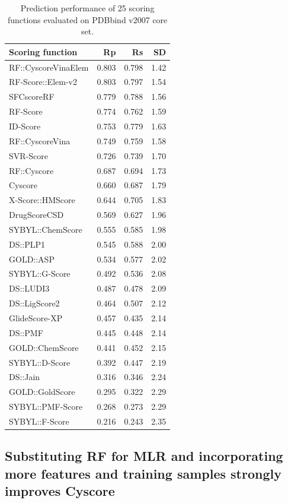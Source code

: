 \begin{table}
\caption{Prediction performance of 25 scoring functions evaluated on PDBbind v2007 core set.}
\label{rfcyscore:trn1105tst195}
\begin{tabular}{lrrr}
\hline
Scoring function & Rp & Rs & SD\\
\hline
RF::CyscoreVinaElem & 0.803 & 0.798 & 1.42\\
RF-Score::Elem-v2 & 0.803 & 0.797 & 1.54 \\
SFCscoreRF & 0.779 & 0.788 & 1.56\\
RF-Score & 0.774 & 0.762 & 1.59\\
ID-Score & 0.753 & 0.779 & 1.63\\
RF::CyscoreVina & 0.749 & 0.759 & 1.58\\
SVR-Score & 0.726 & 0.739 & 1.70\\
RF::Cyscore & 0.687 & 0.694 & 1.73\\
Cyscore & 0.660 & 0.687 & 1.79\\
X-Score::HMScore & 0.644 & 0.705 & 1.83\\
DrugScoreCSD & 0.569 & 0.627 & 1.96\\
SYBYL::ChemScore & 0.555 & 0.585 & 1.98\\
DS::PLP1 & 0.545 & 0.588 & 2.00\\
GOLD::ASP & 0.534 & 0.577 & 2.02\\
SYBYL::G-Score & 0.492 & 0.536 & 2.08\\
DS::LUDI3 & 0.487 & 0.478 & 2.09\\
DS::LigScore2 & 0.464 & 0.507 & 2.12\\
GlideScore-XP & 0.457 & 0.435 & 2.14\\
DS::PMF & 0.445 & 0.448 & 2.14\\
GOLD::ChemScore & 0.441 & 0.452 & 2.15\\
SYBYL::D-Score & 0.392 & 0.447 & 2.19\\
DS::Jain & 0.316 & 0.346 & 2.24\\
GOLD::GoldScore & 0.295 & 0.322 & 2.29\\
SYBYL::PMF-Score & 0.268 & 0.273 & 2.29\\
SYBYL::F-Score & 0.216 & 0.243 & 2.35\\
\hline
\end{tabular}
\end{table}

\subsection{Substituting RF for MLR and incorporating more features and training samples strongly improves Cyscore}


